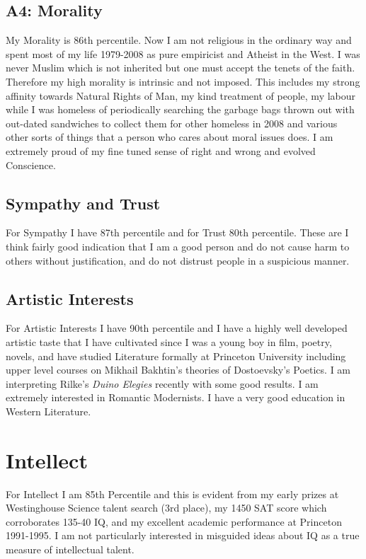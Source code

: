\documentclass{amsart}
\begin{document}
\subsection{A4: Morality}
My Morality is 86th percentile.  Now I am not religious in the ordinary way and spent most of my life 1979-2008 as pure empiricist and Atheist in the West.  I was never Muslim which is not inherited but one must accept the tenets of the faith.  Therefore my high morality is intrinsic and not imposed.  This includes my strong affinity towards Natural Rights of Man, my kind treatment of people, my labour while I was homeless of periodically searching the garbage bags thrown out with out-dated sandwiches to collect them for other homeless in 2008 and various other sorts of things that a person who cares about moral issues does. I am extremely proud of my fine tuned sense of right and wrong and evolved Conscience.  

\subsection{Sympathy and Trust}
For Sympathy I have 87th percentile and for Trust 80th percentile.  These are I think fairly good indication that I am a good person and do not cause harm to others without justification, and do not distrust people in a suspicious manner.

\subsection{Artistic Interests}
For Artistic Interests I have 90th percentile and I have a highly well developed artistic taste that I have cultivated since I was a young boy in film, poetry, novels, and have studied Literature formally at Princeton University including upper level courses on Mikhail Bakhtin's theories of Dostoevsky's Poetics.  I am interpreting Rilke's {\it Duino Elegies} recently with some good results.  I am extremely interested in Romantic Modernists.  I have a very good education in Western Literature.

\section{Intellect}
For Intellect I am 85th Percentile and this is evident from my early prizes at Westinghouse Science talent search (3rd place), my 1450 SAT score which corroborates 135-40 IQ, and my excellent academic performance at Princeton 1991-1995.  I am not particularly interested in misguided ideas about IQ as a true measure of intellectual talent.
\end{document}

